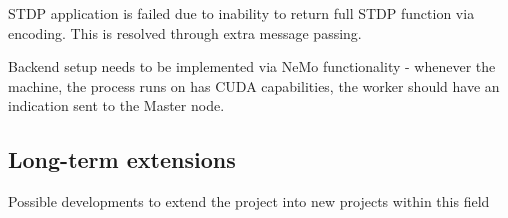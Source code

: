 STDP application is failed due to inability to return full STDP function via encoding. This is resolved through extra message passing.

Backend setup needs to be implemented via NeMo functionality - whenever the machine, the process runs on has CUDA capabilities, the worker should have an indication sent to the Master node.

\subsection{Long-term extensions}

Possible developments to extend the project into new projects within this field
